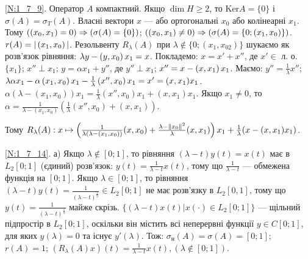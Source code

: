 \noindent\ref{N:1_7_9}. Оператор $A$ компактний. Якщо $\dim H \geq 2$, то $\mathrm{Ker} A = \{0\}$ і $\sigma (A) = \sigma_T (A)$.
 Власні вектори $x$ --- або ортогональні $x_0$ або колінеарні $x_1$. Тому 
 $(\left(x_0, x_1\right) = 0) \Rightarrow (\sigma (A) = \{0\})$; 
 $(\left(x_0, x_1\right) \neq 0) \Rightarrow (\sigma(A) = \{0; \left(x_1, x_0\right)\})$. $r(A) = |\left(x_1, x_0\right)|$. 
 Резольвенту $R_{\lambda} (A)$ при $\lambda \notin \{0; (x_1, x_02)\}$ шукаємо як розв'язок рівняння: $\lambda y - \left(y, x_0\right) x_1 = x$.
 Покладемо: $x = x' + x''$, де $x' \in$ л. о. $\{x_1\}$; $x'' \perp x_1$; $y = \alpha x_1 + y''$, де $y'' \perp x_{1}$;
 $x'' = x - \left(x, x_{1}\right)x_{1}$. Маємо: $y'' = \frac{1}{\lambda} x''$; 
 $\lambda \alpha x_1 - \alpha \left(x_1, x_0\right) x_1 - \frac{1}{\lambda}\left(x'', x_0\right)x_1 = x' = (x, x_1)x_1$.
 $\alpha(\lambda - (x_1, x_0))x_1 = \frac{1}{\lambda}(x'', x_0)x_1 + (x, x_1)x_1$.
 Якщо $x_1 \neq 0$, то $\alpha = \frac{1}{\lambda - (x_1, x_0)}\left(\frac{1}{\lambda}(x'', x_0)+(x, x_1)\right)$.
 
 Тому $R_{\lambda} (A): x \mapsto \left(\frac{1}{\lambda(\lambda - (x_1, x_0))}(x, x_0)+\frac{\lambda - \left\lVert x_0\right\rVert^2}{\lambda}(x, x_1)\right)x_1 + \frac{1}{\lambda}(x - (x, x_1)x_1)$.
 
\noindent\ref{N:1_7_14}. а) Якщо $\lambda \notin [0; 1]$, то рівняння $(\lambda - t)y(t) = x(t)$ має в $L_2 [0; 1]$
 (єдиний) розв'язок: $y(t) = \frac{1}{\lambda - t}x(t)$, тому що $\frac{1}{\lambda - t}$ --- обмежена функція на $[0; 1]$.
 Якщо $\lambda \in [0; 1]$, то рівняння $(\lambda - t)y(t) = \frac{1}{(\lambda - t)^{\frac{1}{3}}} \in L_2[0; 1]$ не має розв'язку в $L_2[0,1]$,
 тому що $y(t) = \frac{1}{(\lambda - t)^{\frac{4}{3}}}$ майже скрізь.
 $\{(\lambda - t)x(t) \big| x(\cdot) \in L_2 [0;1]\}$ --- щільний підпростір в $L_2 [0; 1]$, оскільки він містить всі неперервні функції
 $y \in C[0; 1]$, для яких $y(\lambda) = 0$ та існує $y'(\lambda)$. Тож:
 $\sigma_{\text{н}} (A) = \sigma (A) = [0; 1]$; $r(A) = 1$; $(R_{\lambda} (A)x)(t) = \frac{1}{\lambda - t}x(t), (\lambda \notin [0;1])$.

